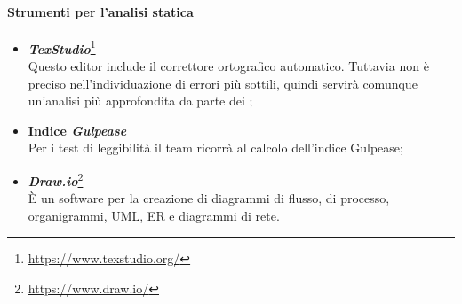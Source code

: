 	\paragraph{Strumenti per l'analisi statica}
	\begin{itemize}
		\item \emph{\textbf{\emph{TexStudio}}}\footnote{\href{https://www.texstudio.org/}{https://www.texstudio.org/}}
		~\\Questo editor include il correttore ortografico automatico. Tuttavia non è preciso nell'individuazione di errori più sottili, quindi servirà comunque un'analisi più approfondita da parte dei \vers;
		\item \textbf{Indice \emph{Gulpease}}
		~\\Per i test di leggibilità il team ricorrà al calcolo dell'indice Gulpease;
		\begin{comment}
		\item 
		\emph{\textbf{\emph{JSHint}}}\ped{G}\footnote{\href{http://jshint.com/}{http://jshint.com/}}
		~\\È uno strumento \emph{OpenSource}\ped{G} funzionale alla rilevazione degli errori e possibili problemi nel codice \emph{JavaScript}\ped{G};
		\item 
		\emph{\textbf{\emph{W3C CSS Validation Service}}}\ped{G}\footnote{\href{https://jigsaw.w3.org/css-validator/}{https://jigsaw.w3.org/css-validator/}}
		~\\È uno strumento per la validazione dei fogli di stile \emph{CSS}\ped{G};
		\item 
		\emph{\textbf{\emph{W3C Markup Validation Service}}}\ped{G}\footnote{\href{https://validator.w3.org/}{https://validator.w3.org/}}
		~\\È uno strumento per la validazione dei documenti \emph{HTML}\ped{G} e \emph{xHTML}\ped{G};
		\end{comment}
		\item 
		\emph{\textbf{\emph{Draw.io}}}\footnote{\href{https://www.draw.io/}{https://www.draw.io/}}
		\\È un software per la creazione di diagrammi di flusso, di processo, organigrammi, UML, ER e diagrammi di rete.
	\end{itemize}
